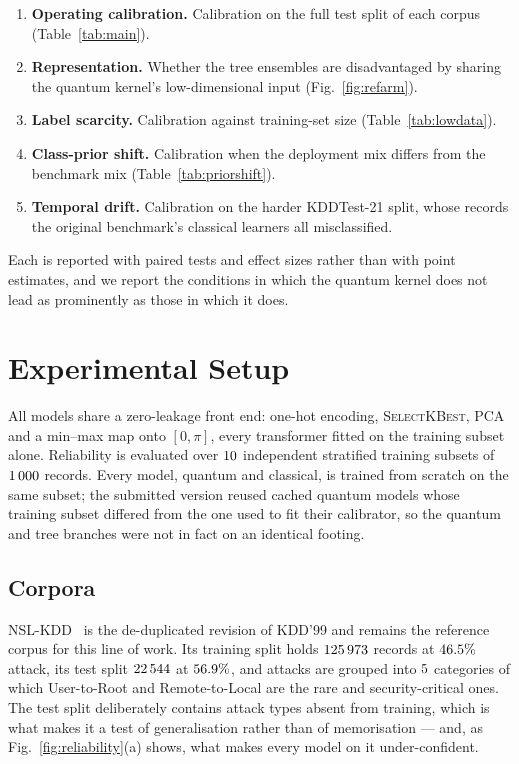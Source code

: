 \documentclass[journal]{IEEEtran}
\begin{document}
\begin{enumerate}
  \item \textbf{Operating calibration.} Calibration on the full test split
        of each corpus (Table~\ref{tab:main}).
  \item \textbf{Representation.} Whether the tree ensembles are
        disadvantaged by sharing the quantum kernel's low-dimensional input
        (Fig.~\ref{fig:refarm}).
  \item \textbf{Label scarcity.} Calibration against training-set size
        (Table~\ref{tab:lowdata}).
  \item \textbf{Class-prior shift.} Calibration when the deployment mix
        differs from the benchmark mix (Table~\ref{tab:priorshift}).
  \item \textbf{Temporal drift.} Calibration on the harder KDDTest-21
        split, whose records the original benchmark's classical learners
        all misclassified.
\end{enumerate}

Each is reported with paired tests and effect sizes rather than with point
estimates, and we report the conditions in which the quantum kernel does not
lead as prominently as those in which it does.

\section{Experimental Setup}\label{sec:setup}


All models share a zero-leakage front end: one-hot encoding,
\textsc{SelectKBest}, PCA and a min--max map onto $[0,\pi]$, every
transformer fitted on the training subset alone. Reliability is evaluated
over $10$ independent stratified training subsets of $1\,000$
records. Every model, quantum and classical, is trained from scratch on the
same subset; the submitted version reused cached quantum models whose
training subset differed from the one used to fit their calibrator, so the
quantum and tree branches were not in fact on an identical footing.

\subsection{Corpora}
NSL-KDD~\cite{tavallaee2009nslkdd} is the de-duplicated revision of KDD'99
and remains the reference corpus for this line of work. Its training split
holds $125\,973$ records at $46.5\%$ attack, its test
split $22\,544$ at $56.9\%$, and attacks are grouped
into $5$ categories of which User-to-Root and Remote-to-Local
are the rare and security-critical ones. The test split deliberately
contains attack types absent from training, which is what makes it a test of
generalisation rather than of memorisation --- and, as
Fig.~\ref{fig:reliability}(a) shows, what makes every model on it
under-confident.
\end{document}
